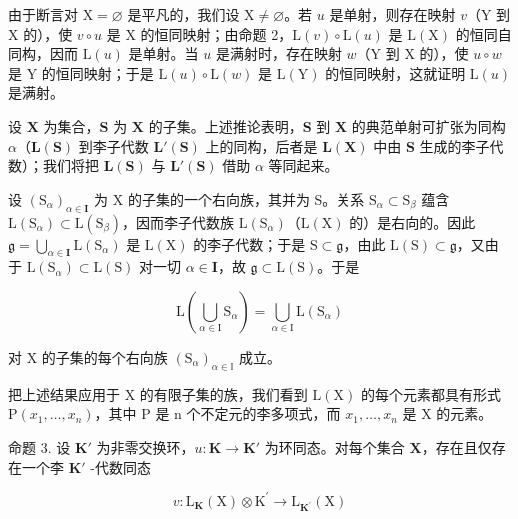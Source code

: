 由于断言对 \(\mathrm{X} = \varnothing\) 是平凡的，我们设 \(\mathrm{X} \neq \varnothing\)。若 \(u\) 是单射，则存在映射 \(v\)（\(\mathrm{Y}\) 到 \(\mathrm{X}\) 的），使 \(v \circ u\) 是 \(\mathrm{X}\) 的恒同映射；由命题 2，\(\mathrm{L}(v) \circ \mathrm{L}(u)\) 是 \(\mathrm{L}(\mathrm{X})\) 的恒同自同构，因而 \(\mathrm{L}(u)\) 是单射。当 \(u\) 是满射时，存在映射 \(w\)（\(\mathrm{Y}\) 到 \(\mathrm{X}\) 的），使 \(u \circ w\) 是 \(\mathrm{Y}\) 的恒同映射；于是 \(\mathrm{L}(u) \circ \mathrm{L}(w)\) 是 \(\mathrm{L}(\mathrm{Y})\) 的恒同映射，这就证明 \(\mathrm{L}(u)\) 是满射。

设 \(\mathbf{X}\) 为集合，\(\mathbf{S}\) 为 \(\mathbf{X}\) 的子集。上述推论表明，\(\mathbf{S}\) 到 \(\mathbf{X}\) 的典范单射可扩张为同构 \(\alpha\)（\(\mathbf{L}(\mathbf{S})\) 到李子代数 \(\mathbf{L}'(\mathbf{S})\) 上的同构，后者是 \(\mathbf{L}(\mathbf{X})\) 中由 \(\mathbf{S}\) 生成的李子代数）；我们将把 \(\mathbf{L}(\mathbf{S})\) 与 \(\mathbf{L}'(\mathbf{S})\) 借助 \(\alpha\) 等同起来。

设 \((\mathrm{S}_{\alpha})_{\alpha \in \mathbf{I}}\) 为 X 的子集的一个右向族，其并为 S。关系 \(\mathrm{S}_{\alpha} \subset \mathrm{S}_{\beta}\) 蕴含 \(\mathrm{L}(\mathrm{S}_{\alpha}) \subset \mathrm{L}(\mathrm{S}_{\beta})\)，因而李子代数族 \(\mathrm{L}(\mathrm{S}_{\alpha})\)（\(\mathrm{L}(\mathrm{X})\) 的）是右向的。因此 \(\mathfrak{g} = \bigcup_{\alpha \in \mathbf{I}} \mathrm{L}(\mathrm{S}_{\alpha})\) 是 \(\mathrm{L}(\mathrm{X})\) 的李子代数；于是 \(\mathrm{S} \subset \mathfrak{g}\)，由此 \(\mathrm{L}(\mathrm{S}) \subset \mathfrak{g}\)，又由于 \(\mathrm{L}(\mathrm{S}_{\alpha}) \subset \mathrm{L}(\mathrm{S})\) 对一切 \(\alpha \in \mathbf{I}\)，故 \(\mathfrak{g} \subset \mathrm{L}(\mathrm{S})\)。于是

\[
\mathrm{L} \left(\bigcup_ {\alpha \in \mathrm{I}} \mathrm{S} _ {\alpha}\right) = \bigcup_ {\alpha \in \mathrm{I}} \mathrm{L} (\mathrm{S} _ {\alpha})\tag{7}
\]

对 X 的子集的每个右向族 \((\mathrm{S}_{\alpha})_{\alpha\in\mathbb{I}}\) 成立。

把上述结果应用于 X 的有限子集的族，我们看到 \(\mathrm{L}(\mathrm{X})\) 的每个元素都具有形式 \(\mathrm{P}(x_{1},\ldots,x_{n})\)，其中 P 是 n 个不定元的李多项式，而 \(x_{1},\ldots,x_{n}\) 是 X 的元素。

命题 3. 设 \(\mathbf{K}'\) 为非零交换环，\(u: \mathbf{K} \to \mathbf{K}'\) 为环同态。对每个集合 \(\mathbf{X}\)，存在且仅存在一个李 \(\mathbf{K}'\) -代数同态

\[
v \colon \mathrm{L} _ {\mathbf {K}} (\mathrm{X}) \otimes \mathrm{K} ^ {\prime} \rightarrow \mathrm{L} _ {\mathbf {K} ^ {\prime}} (\mathrm{X})
\]

